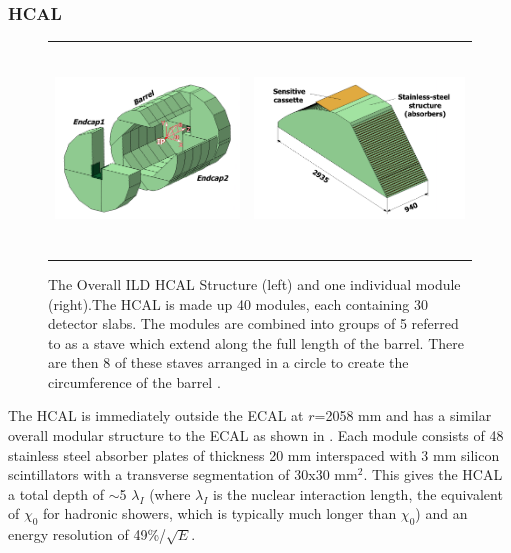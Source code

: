 \subsubsection{HCAL}

\begin{figure}[h]
  \centering
  \begin{tabular}[c]{cc}
    \includegraphics[height=5.5cm]{Experiments/fig/DHCALview_global.png} &
    \includegraphics[height=5.5cm]{Experiments/fig/DHCALview_module.png}
  \end{tabular}
  \caption[HCAL Structure]{The Overall ILD HCAL Structure (left) and one individual module (right).The HCAL is made up 40 modules, each containing 30 detector slabs. The modules are combined into groups of 5 referred to as a stave which extend along the full length of the barrel. There are then 8 of these staves arranged in a circle to create the circumference of the barrel \cite{ILD}.}
  \label{fig:HCAL}
\end{figure}

The \ac{HCAL} is immediately outside the ECAL at $r$=2058 mm and has a similar overall modular structure to the \ac{ECAL} as shown in . Each module consists of 48 stainless steel absorber plates of thickness 20 mm interspaced with 3 mm silicon scintillators with a transverse segmentation of 30x30 mm$^2$. This gives the \ac{HCAL} a total depth of $\sim$5 $\lambda_I$ (where $\lambda_I$ is the nuclear interaction length, the equivalent of $\chi_0$ for hadronic showers, which is typically much longer than $\chi_0$) and an energy resolution of 49\%/$\sqrt{E}$.

